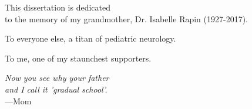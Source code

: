 %
\begin{frontmatter}

%
%
\makefrontmatter

%
%
%
%
%
%
\begin{dedication}
  This dissertation is dedicated\\
  to the memory of my grandmother, Dr. Isabelle Rapin (1927-2017).

  To everyone else, a titan of pediatric neurology.

  To me, one of my staunchest supporters.
\end{dedication}


%
%



%
%
\begin{epigraph} %
  \emph{Now you see why your father\\
        and I call it 'gradual school'.}\\
  ---Mom
\end{epigraph}

%



\end{frontmatter}
